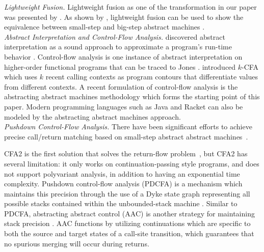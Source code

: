 \documentclass[acmsmall, review]{acmart}\settopmatter{}
\begin{document}
\textit{Lightweight Fusion.}
Lightweight fusion as one of the transformation in our paper was presented by 
\citeauthor{Ohori:2007:LFF:1190216.1190241} \cite{Ohori:2007:LFF:1190216.1190241}.
As shown by \citeauthor{DANVY2008100}, lightweight fusion can be used to show the 
equivalence between small-step and big-step abstract machines \cite{DANVY2008100}.\\

\textit{Abstract Interpretation and Control-Flow Analysis.}
\citeauthor{cousot1977abstract} discovered abstract interpretation as a sound approach to
approximate a program's run-time behavior \cite{cousot1977abstract}. Control-flow analysis
is one instance of abstract interpretation on higher-order functional programs that can be traced to
Jones \cite{jones1981flow}.  
introduced $k$-CFA which uses $k$ recent calling contexts as program contours that 
differentiate values from different contexts.
A recent formulation of control-flow analysis is the abstracting abstract machines
methodology \cite{van2012systematic, van2010abstracting} which forms the starting point
of this paper. Modern programming languages such as Java \cite{might2010resolving} and
Racket \cite{Tobin-Hochstadt:2012:HSE:2384616.2384655} can also be modeled by the abstracting
abstract machines approach. \\

\textit{Pushdown Control-Flow Analysis.}
There have been significant efforts to achieve precise call/return matching 
based on small-step abstract abstract machines~\cite{vardoulakis2010cfa2, earl2012introspective,
gilray2016pushdown, johnson2015abstracting}.

CFA2 is the first solution that solves the return-flow problem~\cite{vardoulakis2010cfa2},
but CFA2 has several limitation: it only works on continuation-passing style programs, and
does not support polyvariant analysis, in addition to having an exponential time complexity.
Pushdown control-flow analysis (PDCFA) is a mechanism which maintains this precision through
the use of a Dyke state graph representing all possible stacks contained within the unbounded-stack
machine \cite{earl2012introspective, earl2010pushdown}. Similar to PDCFA, abstracting abstract
control (AAC) is another strategy for maintaining stack precision \cite{johnson2015abstracting}.
AAC functions by utilizing continuations which are specific to both the source and target states
of a call-site transition, which guarantees that no spurious merging will occur during returns.
\end{document}
